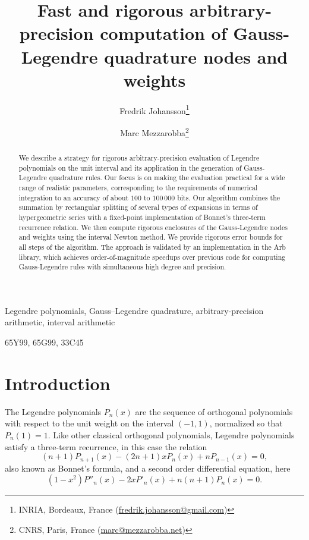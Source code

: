 \documentclass[nohypdvips,review]{siamart0216}
\begin{document}

\title{Fast and rigorous arbitrary-precision computation of Gauss-Legendre quadrature nodes and weights}
\author{Fredrik Johansson\thanks{INRIA, Bordeaux, France (\url{fredrik.johansson@gmail.com})}
 \and
Marc Mezzarobba\thanks{CNRS, Paris, France (\url{marc@mezzarobba.net})}}
\maketitle

\begin{abstract}
We describe a strategy for rigorous
arbitrary-precision evaluation of Legendre polynomials on the unit
interval and its application in the generation of Gauss-Legendre
quadrature rules.
Our focus is on making the evaluation practical for a wide range of
realistic parameters, corresponding to the requirements of numerical
integration to an accuracy of about $100$ to $100\,000$ bits.
Our algorithm combines the summation by rectangular
splitting of several types of expansions in terms of hypergeometric
series with a fixed-point implementation of Bonnet's three-term
recurrence relation.
We then compute rigorous enclosures of the Gauss-Legendre nodes and
weights using the interval Newton method.
We provide rigorous error bounds for all steps of the algorithm.
The approach is validated by an implementation in the Arb library,
which achieves order-of-magnitude speedups over
previous code for computing Gauss-Legendre rules with simultaneous
high degree and precision.
\end{abstract}

\begin{keywords}
Legendre polynomials, Gauss--Legendre quadrature, arbitrary-precision arithmetic, interval arithmetic
\end{keywords}

\begin{AMS}
65Y99, 65G99, 33C45
\end{AMS}

\section{Introduction}

The Legendre polynomials $P_n(x)$ are the sequence
of orthogonal polynomials with respect to the unit weight
on the interval $(-1,1)$, normalized so that $P_n(1) = 1$.
Like other classical orthogonal polynomials, Legendre polynomials
satisfy a three-term recurrence, in this case the relation
\begin{equation} \label{eq:recurrence}
  (n + 1) P_{n+1}(x) - (2n + 1) x P_n(x) + n P_{n-1}(x) = 0,
\end{equation}
also known as Bonnet's formula, and a second order differential equation, here
\begin{equation} \label{eq:diffeq}
  (1 - x^2) P''_n(x) - 2 x P'_n(x) + n (n+1) P_n(x) = 0.
\end{equation}
\end{document}
